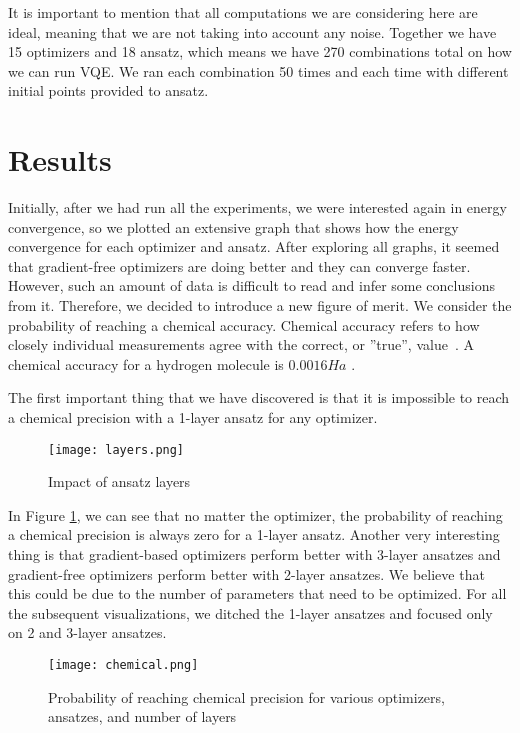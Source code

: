 It is important to mention that all computations we are considering here are ideal, meaning that we are not taking into account any noise. Together we have 15 optimizers and 18 ansatz, which means we have 270 combinations total on how we can run VQE. We ran each combination 50 times and each time with different initial points provided to ansatz. 

\section{Results} 
Initially, after we had run all the experiments, we were interested again in energy convergence, so we plotted an extensive graph that shows how the energy convergence for each optimizer and ansatz. After exploring all graphs, it seemed that gradient-free optimizers are doing better and they can converge faster. However, such an amount of data is difficult to read and infer some conclusions from it. Therefore, we decided to introduce a new figure of merit. We consider the probability of reaching a chemical accuracy. Chemical accuracy refers to how closely individual measurements agree with the correct, or ''true'', value~\cite{chemistry}. A chemical accuracy for a hydrogen molecule is $0.0016Ha$ . 


The first important thing that we have discovered is that it is impossible to reach a chemical precision with a 1-layer ansatz for any optimizer.
\begin{figure}[H]
    \centering
    \texttt{[image: layers.png]}
    \caption{Impact of ansatz layers}
    \label{fig:ansatz-layers}
\end{figure}

In Figure \ref{fig:ansatz-layers}, we can see that no matter the optimizer, the probability of reaching a chemical precision is always zero for a 1-layer ansatz. Another very interesting thing is that gradient-based optimizers perform better with 3-layer ansatzes and gradient-free optimizers perform better with 2-layer ansatzes. We believe that this could be due to the number of parameters that need to be optimized. For all the subsequent visualizations, we ditched the 1-layer ansatzes and focused only on 2 and 3-layer ansatzes.

\begin{figure}[H]
    \centering
    \texttt{[image: chemical.png]}
    \caption{Probability of reaching chemical precision for various optimizers, ansatzes, and number of layers}
    \label{fig:chemical}
\end{figure}

